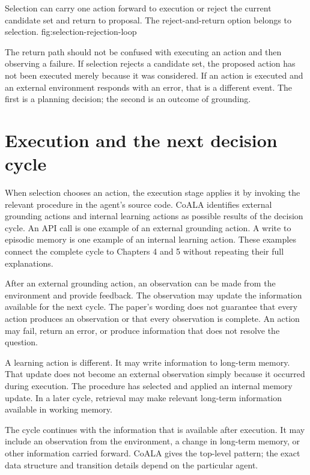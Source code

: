   {Selection can carry one action forward to execution or reject the current candidate set and return to proposal. The reject-and-return option belongs to selection.}
  {fig:selection-rejection-loop}

The return path should not be confused with executing an action and then observing a failure. If selection rejects a candidate set, the proposed action has not been executed merely because it was considered. If an action is executed and an external environment responds with an error, that is a different event. The first is a planning decision; the second is an outcome of grounding.

\section{Execution and the next decision cycle}
\label{sec:execution-next-cycle}

When selection chooses an action, the execution stage applies it by invoking the relevant procedure in the agent's source code. CoALA identifies external grounding actions and internal learning actions as possible results of the decision cycle. An API call is one example of an external grounding action. A write to episodic memory is one example of an internal learning action. These examples connect the complete cycle to Chapters 4 and 5 without repeating their full explanations.

After an external grounding action, an observation can be made from the environment and provide feedback. The observation may update the information available for the next cycle. The paper's wording does not guarantee that every action produces an observation or that every observation is complete. An action may fail, return an error, or produce information that does not resolve the question.

A learning action is different. It may write information to long-term memory. That update does not become an external observation simply because it occurred during execution. The procedure has selected and applied an internal memory update. In a later cycle, retrieval may make relevant long-term information available in working memory.

The cycle continues with the information that is available after execution. It may include an observation from the environment, a change in long-term memory, or other information carried forward. CoALA gives the top-level pattern; the exact data structure and transition details depend on the particular agent.

